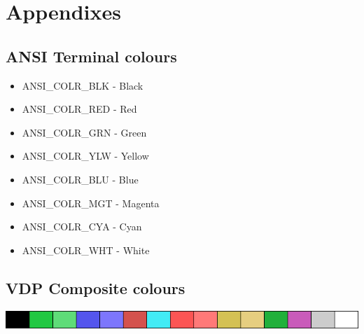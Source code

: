 \section{Appendixes}
\label{sec:appendixes}

    \subsection{ANSI Terminal colours}

    \begin{itemize}
        \item ANSI\_COLR\_BLK - Black
        \item ANSI\_COLR\_RED - Red
        \item ANSI\_COLR\_GRN - Green
        \item ANSI\_COLR\_YLW - Yellow
        \item ANSI\_COLR\_BLU - Blue
        \item ANSI\_COLR\_MGT - Magenta
        \item ANSI\_COLR\_CYA - Cyan
        \item ANSI\_COLR\_WHT - White
    \end{itemize}

    \subsection{VDP Composite colours}
    \label{sec:vdp_colours}

    \includegraphics[scale=0.7]{images/TMS9918Apalette.png}

